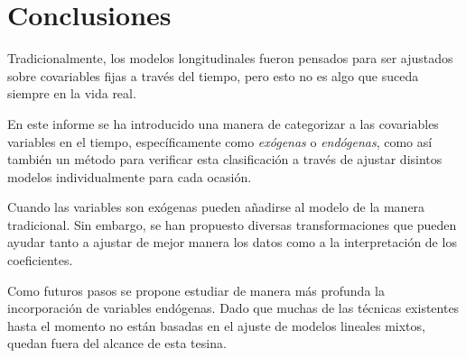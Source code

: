 \documentclass[spanish]{article}
\numberwithin{figure}{subsection}
\numberwithin{equation}{subsection}
\numberwithin{table}{subsection}
\begin{document}
\newpage

\section{Conclusiones}

Tradicionalmente, los modelos longitudinales fueron pensados para ser ajustados
sobre covariables fijas a través del tiempo, pero esto no es algo que suceda
siempre en la vida real.

En este informe se ha introducido una manera de categorizar a las covariables
variables en el tiempo, específicamente como \textit{exógenas} o
\textit{endógenas}, como así también un método para verificar esta clasificación
a través de ajustar disintos modelos individualmente para cada ocasión.

Cuando las variables son exógenas pueden añadirse al modelo de la manera
tradicional. Sin embargo, se han propuesto diversas transformaciones que pueden
ayudar tanto a ajustar de mejor manera los datos como a la interpretación de los
coeficientes.

Como futuros pasos se propone estudiar de manera más profunda la incorporación
de variables endógenas. Dado que muchas de las técnicas existentes hasta el
momento no están basadas en el ajuste de modelos lineales mixtos, quedan fuera
del alcance de esta tesina.

\newpage
\nocite{*}
\renewcommand{\refname}{Bibliografía}

\end{document}
